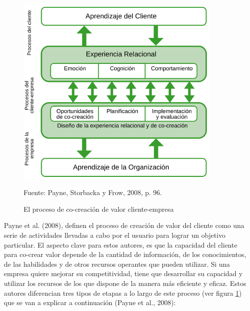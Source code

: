 \begin{figure}[!h]
	\caption{El proceso de co-creación de valor cliente-empresa}
	\centering \includegraphics[width=100mm]{capitulos/graficos/procesosCocreacionPayne} 
	\label{fig:procesosCocreacionPayne} 
	
		\footnotesize
		Fuente: Payne, Storbacka y Frow, 2008, p. 96.
\end{figure}

Payne et al. (2008), definen el proceso de creación de valor del cliente como una serie de actividades llevadas a cabo por el usuario para lograr un objetivo particular. El aspecto clave para estos autores, es que la capacidad del cliente para co-crear valor depende de la cantidad de información, de los conocimientos, de las habilidades y de otros recursos operantes que pueden utilizar. Si una empresa quiere mejorar su competitividad, tiene que desarrollar su capacidad y utilizar los recursos de los que dispone de la manera más eficiente y eficaz. Estos autores diferencian tres tipos de etapas a lo largo de este proceso (ver figura \ref{fig:procesosCocreacionPayne}) que se van a explicar a continuación (Payne et al., 2008):


